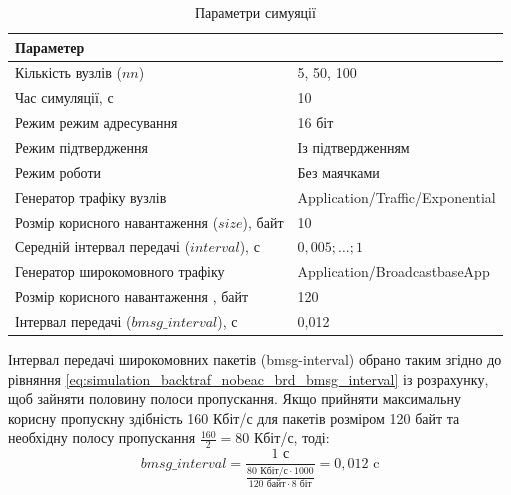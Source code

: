 \documentclass[a4paper,ukrainian,utf8,nocolumnsxix,floatsection,equationsection]{eskdtext}
\begin{document}
\begin{table}[htbp]
\caption{Параметри симуяції}
\centering
\begin{tabular}{|l|l|}
	\hline
	Параметер                                    &                                 \\ \hline
	Кількість вузлів ($nn$)                      & 5, 50, 100                      \\ \hline
	Час симуляції, с                             & 10                              \\ \hline
	Режим режим адресування                      & 16 біт                          \\ \hline
	Режим підтвердження                          & Із підтвердженням               \\ \hline
	Режим роботи                                 & Без маячками                    \\ \hline
	Генератор трафіку вузлів                     & Application/Traffic/Exponential \\ \hline
	Розмір корисного навантаження ($size$), байт & 10                              \\ \hline
	Середній інтервал передачі ($interval$), с   & $0,005;\dots;1$                 \\ \hline
	Генератор широкомовного трафіку              & Application/BroadcastbaseApp    \\ \hline
	Розмір корисного навантаження , байт         & 120                             \\ \hline
	Інтервал передачі ($bmsg\_interval$), с      & 0,012                           \\ \hline
\end{tabular}
\label{tbl:simulation_backtraf_nobeac_brd}
\end{table}

Інтервал передачі широкомовних пакетів (bmsg-interval) обрано таким згідно до рівняння \ref{eq:simulation_backtraf_nobeac_brd_bmsg_interval} із розрахунку, щоб зайняти половину полоси пропускання. Якщо прийняти максимальну корисну пропускну здібність 160 Кбіт/с для пакетів розміром 120 байт та необхідну полосу пропускання $\frac{160}{2}=80$ Кбіт/с, тоді:
\begin{equation}
	\label{eq:simulation_backtraf_nobeac_brd_bmsg_interval}
	bmsg\_interval = \frac{1 \text{ с}}{\frac{80 \text{ Кбіт/с} \cdot 1000}{120 \text{ байт} \cdot 8 \text{ біт}}} = 0,012 \text{ c}
\end{equation}
\end{document}
